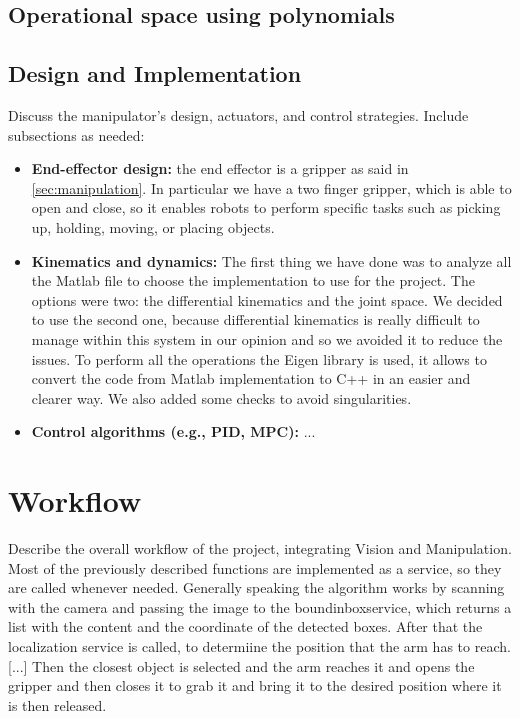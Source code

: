 \documentclass[12pt,a4paper]{article}
\begin{document}
\subsection{Operational space using polynomials}\label{subsec:opspace}


\subsection{Design and Implementation}\label{subsec:design}
Discuss the manipulator's design, actuators, and control strategies. Include subsections as needed:
\begin{itemize}
    \item \textbf{End-effector design:} the end effector is a gripper as said in \ref{sec:manipulation}. In particular we have a two finger gripper, which is able to open and close, so it enables robots to perform specific tasks such as picking up, holding, moving, or placing objects. 
    \item \textbf{Kinematics and dynamics:} The first thing we have done was to analyze all the Matlab file to choose the implementation to use for the project. The options were two: the differential kinematics and the joint space. We decided to use the second one, because differential kinematics is really difficult to manage within this system in our opinion and so we avoided it to reduce the issues. To perform all the operations the Eigen library is used, it allows to convert the code from Matlab implementation to C++ in an easier and clearer way. We also added some checks to avoid singularities. 
    \item \textbf{Control algorithms (e.g., PID, MPC):} ...
\end{itemize}



\section{Workflow}\label{sec:workflow}
Describe the overall workflow of the project, integrating Vision and Manipulation. Most of the previously described functions are implemented as a service, so they are called whenever needed. Generally speaking the algorithm works by scanning with the camera and passing the image to the boundinboxservice, which returns a list with the content and the coordinate of the detected boxes. After that the localization service is called, to determiine the position that the arm has to reach. [...] Then the closest object is selected and the arm reaches it and opens the gripper and then closes it to grab it and bring it to the desired position where it is then released.
\end{document}
